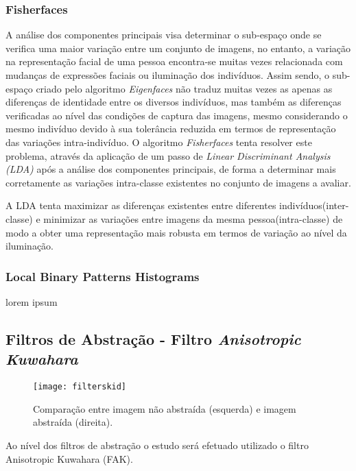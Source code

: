 \subsubsection{Fisherfaces}
A análise dos componentes principais visa determinar o sub-espaço onde se verifica uma maior variação entre um conjunto de imagens, no entanto, a variação na representação facial de uma pessoa encontra-se muitas vezes relacionada com mudanças de expressões faciais ou iluminação dos indivíduos. Assim sendo, o sub-espaço criado pelo algoritmo \textit{Eigenfaces} não traduz muitas vezes as apenas as diferenças de identidade entre os diversos indivíduos, mas também as diferenças verificadas ao nível das condições de captura das imagens, mesmo considerando o mesmo indivíduo devido à sua tolerância reduzida em termos de representação das variações intra-indivíduo. O algoritmo \textit{Fisherfaces} tenta resolver este problema, através da aplicação de um passo de \textit{Linear Discriminant Analysis (LDA)} após a análise dos componentes principais, de forma a determinar mais corretamente as variações intra-classe existentes no conjunto de imagens a avaliar.

A LDA tenta maximizar as diferenças existentes entre diferentes indivíduos(inter-classe) e minimizar as variações entre imagens da mesma pessoa(intra-classe) de modo a obter uma representação mais robusta em termos de variação ao nível da iluminação.


\subsubsection{Local Binary Patterns Histograms}
lorem ipsum

\subsection{Filtros de Abstração - Filtro \textit{Anisotropic Kuwahara}}
\begin{figure}[ht]
  \begin{center}
    \leavevmode
    \texttt{[image: filterskid]}
    \caption{Comparação entre imagem não abstraída (esquerda) e imagem abstraída (direita).}	
    \label{fig:filterskid}
  \end{center}
\end{figure}

Ao nível dos filtros de abstração o estudo será efetuado utilizado o filtro Anisotropic Kuwahara (FAK).

